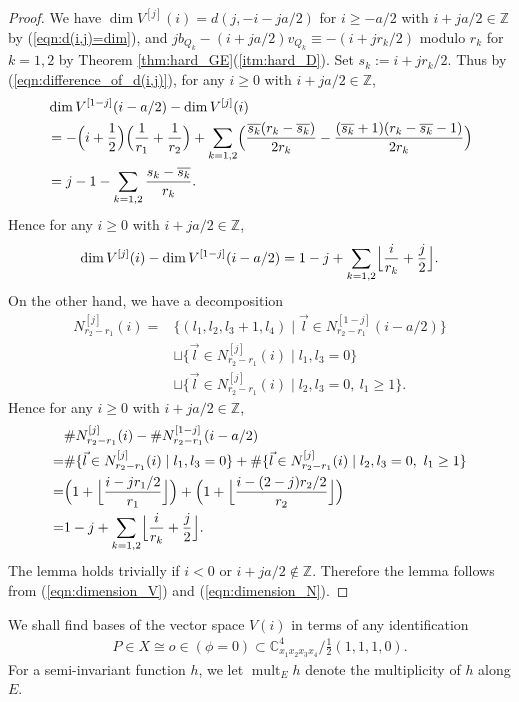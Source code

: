 \documentclass[a4paper,11pt]{amsart}
\theoremstyle{definition}
\theoremstyle{remark}
\numberwithin{equation}{section}
\newcommand{\bC}{{\mathbb C}}
\newcommand{\bZ}{{\mathbb Z}}
\newcommand{\mult}{\operatorname{mult}}
\begin{document}
\begin{proof}
We have
$\dim V^{[j]}(i)=d(j,-i-ja/2)$ for $i\ge -a/2$ with $i+ja/2 \in \bZ$
by (\ref{eqn:d(i,j)=dim}),
and $jb_{Q_k}-(i+ja/2)v_{Q_k}\equiv -(i+jr_k/2)$ modulo $r_k$ for $k=1,2$
by Theorem \ref{thm:hard_GE}(\ref{itm:hard_D}).
Set $s_k:=i+jr_k/2$.
Thus by (\ref{eqn:difference_of_d(i,j)}),
for any $i\ge0$ with $i+ja/2 \in \bZ$,
\begin{align*}
&\dim V^{[1-j]}(i-a/2)-\dim V^{[j]}(i) \\
&=-\Bigl(i+\frac{1}{2}\Bigr)\Bigl(\frac{1}{r_1}+\frac{1}{r_2}\Bigr)
+\sum_{k=1,2}
\Bigl( \frac{\overline{s_k}(r_k-\overline{s_k})}{2r_k}
- \frac{(\overline{s_k}+1)(r_k-\overline{s_k}-1)}{2r_k} \Bigr) \\
&=j-1-\sum_{k=1,2}\frac{s_k-\overline{s_k}}{r_k}.
\end{align*}
Hence for any $i\ge0$ with $i+ja/2 \in \bZ$,
\begin{align}\label{eqn:dimension_V}
\dim V^{[j]}(i)-\dim V^{[1-j]}(i-a/2)
=1-j+\sum_{k=1,2}\Bigl\lfloor \frac{i}{r_k}+\frac{j}{2} \Bigr\rfloor.
\end{align}
On the other hand,
we have a decomposition
\begin{align*}
N_{r_2-r_1}^{[j]}(i)=
&\{(l_1,l_2,l_3+1,l_4) \mid
\vec{l} \in N_{r_2-r_1}^{[1-j]}(i-a/2)\} \\
&\sqcup \{\vec{l}\in N_{r_2-r_1}^{[j]}(i) \mid l_1,l_3=0\} \\
&\sqcup \{\vec{l}\in N_{r_2-r_1}^{[j]}(i) \mid l_2,l_3=0,\ l_1\ge1\}.
\end{align*}
Hence for any $i\ge0$ with $i+ja/2 \in \bZ$,
\begin{align}\label{eqn:dimension_N}
&\#N_{r_2-r_1}^{[j]}(i)-\#N_{r_2-r_1}^{[1-j]}(i-a/2) \\
\nonumber=&
\#\{\vec{l}\in N_{r_2-r_1}^{[j]}(i) \mid l_1,l_3=0\}
+\#\{\vec{l}\in N_{r_2-r_1}^{[j]}(i) \mid l_2,l_3=0,\ l_1\ge1\} \\
\nonumber=&
\Bigl(1+\Bigl\lfloor \frac{i-jr_1/2}{r_1} \Bigr\rfloor\Bigr)
+\Bigl(1+\Bigl\lfloor \frac{i-(2-j)r_2/2}{r_2} \Bigr\rfloor\Bigr) \\
\nonumber=&
1-j+\sum_{k=1,2}\Bigl\lfloor \frac{i}{r_k}+\frac{j}{2} \Bigr\rfloor.
\end{align}
The lemma holds trivially if $i<0$ or $i+ja/2 \not\in \bZ$.
Therefore the lemma follows from
(\ref{eqn:dimension_V}) and (\ref{eqn:dimension_N}).
\end{proof}

We shall find bases of the vector space $V(i)$ in terms of any identification
\begin{align*}
P \in X \cong o \in (\phi=0) \subset \bC^4_{x_1x_2x_3x_4}/\frac{1}{2}(1,1,1,0).
\end{align*}
For a semi-invariant function $h$,
we let $\mult_E h$ denote the multiplicity of $h$ along $E$.
\end{document}
